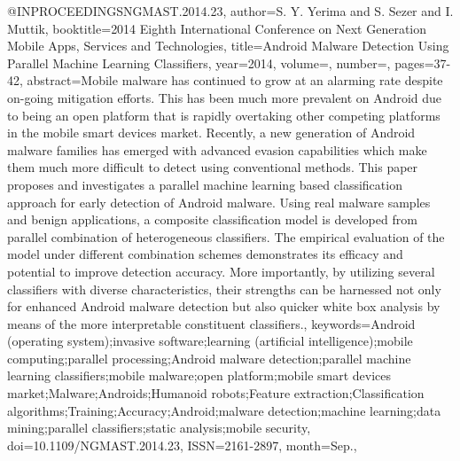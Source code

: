 @INPROCEEDINGS{NGMAST.2014.23, 
author={S. Y. {Yerima} and S. {Sezer} and I. {Muttik}}, 
booktitle={2014 Eighth International Conference on Next Generation Mobile Apps, Services and Technologies}, 
title={Android Malware Detection Using Parallel Machine Learning Classifiers}, 
year={2014}, 
volume={}, 
number={}, 
pages={37-42}, 	 
abstract={Mobile malware has continued to grow at an alarming rate despite on-going mitigation efforts. This has been much more prevalent on Android due to being an open platform that is rapidly overtaking other competing platforms in the mobile smart devices market. Recently, a new generation of Android malware families has emerged with advanced evasion capabilities which make them much more difficult to detect using conventional methods. This paper proposes and investigates a parallel machine learning based classification approach for early detection of Android malware. Using real malware samples and benign applications, a composite classification model is developed from parallel combination of heterogeneous classifiers. The empirical evaluation of the model under different combination schemes demonstrates its efficacy and potential to improve detection accuracy. More importantly, by utilizing several classifiers with diverse characteristics, their strengths can be harnessed not only for enhanced Android malware detection but also quicker white box analysis by means of the more interpretable constituent classifiers.}, 
keywords={Android (operating system);invasive software;learning (artificial intelligence);mobile computing;parallel processing;Android malware detection;parallel machine learning classifiers;mobile malware;open platform;mobile smart devices market;Malware;Androids;Humanoid robots;Feature extraction;Classification algorithms;Training;Accuracy;Android;malware detection;machine learning;data mining;parallel classifiers;static analysis;mobile security}, 
doi={10.1109/NGMAST.2014.23}, 
ISSN={2161-2897}, 
month={Sep.},}
